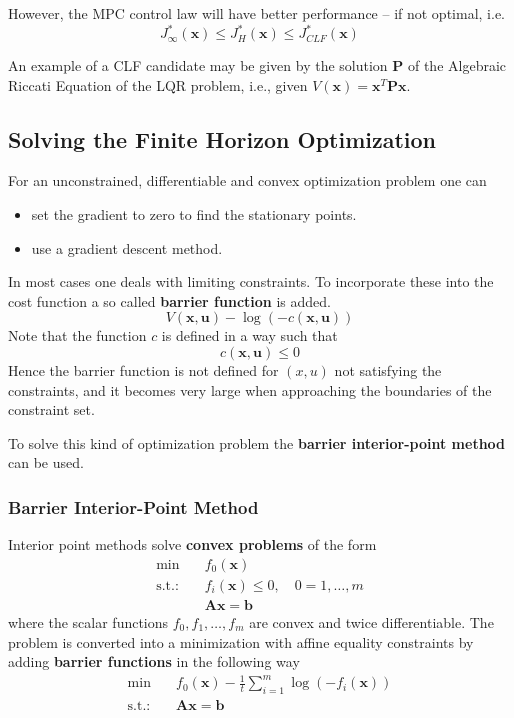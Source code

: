 However, the MPC control law will have better performance -- if not optimal, i.e.
\begin{equation*}
    J^*_\infty(\mathbf{x}) \leq J^*_H(\mathbf{x}) \leq J^*_{CLF}(\mathbf{x})
\end{equation*}

An example of a CLF candidate may be given by the solution $\mathbf{P}$ of the Algebraic Riccati Equation of the LQR problem, i.e., given $V(\mathbf{x}) = \mathbf{x}^T \mathbf{Px}$.

\subsection{Solving the Finite Horizon Optimization}

For an unconstrained, differentiable and convex optimization problem one can
\begin{itemize}
    \item set the gradient to zero to find the stationary points.
    \item use a gradient descent method.
\end{itemize}

In most cases one deals with limiting constraints. To incorporate these into the cost function a so called \textbf{barrier function} is added.
\begin{equation*}
    V(\mathbf{x,u}) - \log(-c(\mathbf{x,u}))
\end{equation*}
Note that the function $c$ is defined in a way such that
\begin{equation*}
    c(\mathbf{x,u}) \leq 0
\end{equation*}
Hence the barrier function is not defined for $(x,u)$ not satisfying the constraints, and it becomes very large when approaching the boundaries of the constraint set.

To solve this kind of optimization problem the \textbf{barrier interior-point method} can be used.

\subsubsection{Barrier Interior-Point Method}
Interior point methods solve \textbf{convex problems} of the form
\begin{align*}
    \min \quad         & f_0( \mathbf{x})                                 \\
    \text{s.t.:} \quad & f_i( \mathbf{x}) \leq 0 , \quad 0 = 1, \ldots, m \\
                       & \mathbf{Ax} = \mathbf{b}
\end{align*}
where the scalar functions $f_0,f_1,\ldots,f_m$ are convex and twice differentiable.
\newpar{}
The problem is converted into a minimization with affine equality constraints by adding \textbf{barrier functions} in the following way
\begin{align*}
    \min \quad        & f_0(\mathbf{x}) - \frac{1}{t}\sum_{i=1}^{m}\log(-f_i(\mathbf{x})) \\
    \text{s.t.:}\quad & \mathbf{Ax}=\mathbf{b}
\end{align*}

